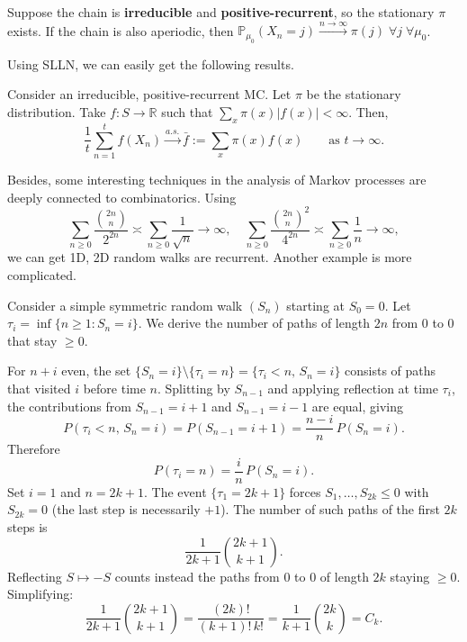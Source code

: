 \begin{thm}
Suppose the chain is \textbf{irreducible} and \textbf{positive-recurrent}, so the stationary $\pi$ exists. If the chain is also aperiodic, then $\mathbb{P}_{\mu_0}(X_n = j) \xrightarrow{n \to \infty} \pi(j) \; \forall j \; \forall \mu_0$.
\end{thm}
Using SLLN, we can easily get the following results.
\begin{thm}
Consider an irreducible, positive-recurrent MC. Let $\pi$ be the stationary distribution. Take $f : S \to \mathbb{R}$ such that $\sum_x \pi(x)|f(x)| < \infty$. Then,
\[
\frac{1}{t} \sum_{n=1}^{t} f(X_n) \xrightarrow{a.s.} \bar{f} := \sum_x \pi(x) f(x) \qquad \text{as } t \to \infty.
\]
\end{thm}

\begin{rem}
    Besides, some interesting techniques in the analysis of Markov processes are deeply connected to combinatorics. Using
    \[
    \sum_{n\ge 0} \frac{\binom{2n}{n}}{2^{2n}} \asymp \sum_{n\ge 0}\frac{1}{\sqrt{n}} \to \infty, \quad \sum_{n\ge 0} \frac{\binom{2n}{n}^2}{4^{2n}} \asymp \sum_{n\ge 0}\frac{1}{n} \to \infty,
    \]
    we can get 1D, 2D random walks are recurrent. Another example is more complicated.
\end{rem}

\begin{exam}
    Consider a simple symmetric random walk $(S_n)$ starting at $S_0=0$.
Let $\tau_i = \inf\{n \geq 1: S_n = i\}$.
We derive the number of paths of length $2n$ from $0$ to $0$ that stay $\geq 0$.

For $n+i$ even, the set $\{S_n = i\}\setminus\{\tau_i = n\} = \{\tau_i < n,\, S_n = i\}$ consists of paths that visited $i$ before time $n$.
Splitting by $S_{n-1}$ and applying reflection at time $\tau_i$, the contributions from $S_{n-1}=i+1$ and $S_{n-1}=i-1$ are equal, giving
\[
  P(\tau_i < n,\, S_n = i) = P(S_{n-1} = i+1) = \frac{n-i}{n}\,P(S_n = i).
\]
Therefore
\[
  P(\tau_i = n) = \frac{i}{n}\,P(S_n = i).
\]
Set $i=1$ and $n=2k+1$.  The event $\{\tau_1 = 2k+1\}$ forces $S_1,\ldots,S_{2k}\leq 0$ with $S_{2k}=0$ (the last step is necessarily $+1$). The number of such paths of the first $2k$ steps is
\[
  \frac{1}{2k+1}\binom{2k+1}{k+1}.
\]
Reflecting $S\mapsto -S$ counts instead the paths from $0$ to $0$ of length $2k$ staying $\geq 0$.  Simplifying:
\[
  \frac{1}{2k+1}\binom{2k+1}{k+1}
  = \frac{(2k)!}{(k+1)!\,k!}
  = \frac{1}{k+1}\binom{2k}{k}
  = C_k.
\]
\end{exam}


